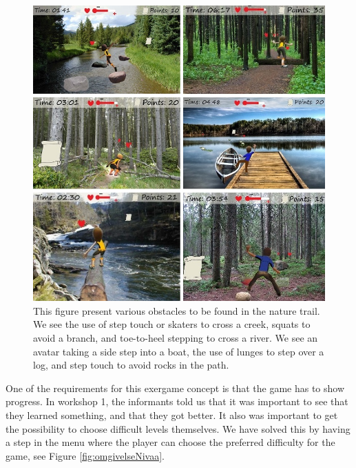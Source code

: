 \begin{figure} [H]
\centering
\includegraphics[scale=0.6]{hindringerEng.jpg}
\caption[Nature trail - obstacles]{This figure present various obstacles to be found in the nature trail. We see the use of step touch or skaters to cross a creek, squats to avoid a branch, and toe-to-heel stepping to cross a river. We see an avatar taking a side step into a boat, the use of lunges to step over a log, and step touch to avoid rocks in the path.}
\label{fig:hindring}
\end{figure}

One of the requirements for this exergame concept is that the game has to show progress. In workshop 1, the informants told us that it was important to see that they learned something, and that they got better. It also was important to get the possibility to choose difficult levels themselves. We have solved this by having a step in the menu where the player can choose the preferred difficulty for the game, see Figure \ref{fig:omgivelseNivaa}. 

